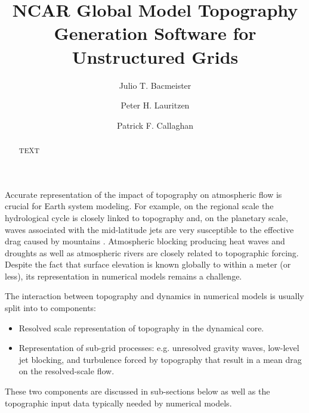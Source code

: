 \documentclass[gmd]{copernicus}
\begin{document}
\linenumbers

\title{NCAR Global Model Topography Generation Software for Unstructured Grids}


\author[1]{Julio T. Bacmeister}
\author[1]{Peter H. Lauritzen}
\author[1]{Patrick F. Callaghan}













\maketitle  %



\begin{abstract}
TEXT
\end{abstract}



\introduction  %
Accurate representation of the impact of topography on atmospheric flow is crucial for Earth system modeling.  For example, on the regional scale the hydrological cycle is closely linked to topography and, on the planetary scale, waves associated with the mid-latitude jets are very susceptible to the effective drag caused by mountains \citep[e.g., ][]{LM1997QJRMS}. Atmospheric blocking producing heat waves and droughts as well as atmospheric rivers are closely related to topographic forcing. Despite the fact that surface elevation is known globally to within a meter (or less), its representation in numerical models remains a challenge.

The interaction between topography and dynamics in numerical models is usually split into to components:
\begin{itemize}
\item Resolved scale representation of topography in the dynamical core.
\item Representation of sub-grid processes: e.g. unresolved gravity waves, low-level jet blocking, and turbulence forced by topography that result in a mean drag on the resolved-scale flow.
\end{itemize}
These two components are discussed in sub-sections below as well as the topographic input data typically needed by numerical models.
\end{document}
